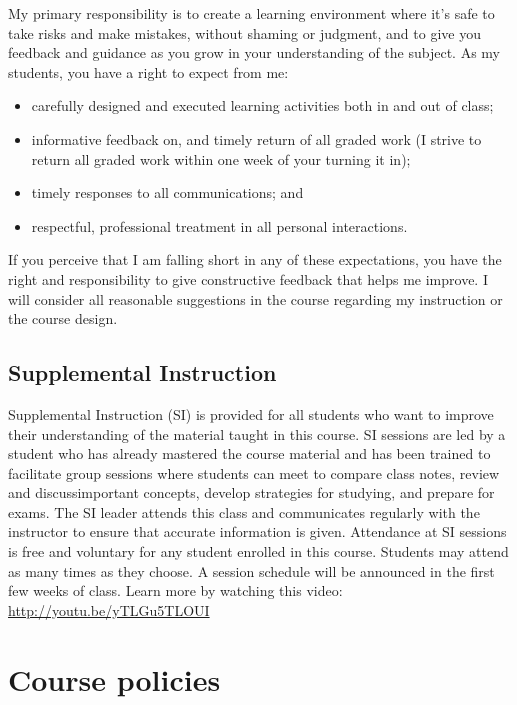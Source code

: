 My primary responsibility is to create a learning environment where it's
safe to take risks and make mistakes, without shaming or judgment, and
to give you feedback and guidance as you grow in your understanding of
the subject. As my students, you have a right to expect from me:

\begin{itemize}
\tightlist
\item
  carefully designed and executed learning activities both in and out of
  class;
\item
  informative feedback on, and timely return of all graded work (I
  strive to return all graded work within one week of your turning it
  in);
\item
  timely responses to all communications; and
\item
  respectful, professional treatment in all personal interactions.
\end{itemize}

If you perceive that I am falling short in any of these expectations,
you have the right and responsibility to give constructive feedback that
helps me improve. I will consider all reasonable suggestions in the
course regarding my instruction or the course design.

\hypertarget{supplemental-instruction-1}{%
\subsection{Supplemental Instruction}\label{supplemental-instruction-1}}

Supplemental Instruction (SI) is provided for all students who want to
improve their understanding of the material taught in this course. SI
sessions are led by a student who has already mastered the course
material and has been trained to facilitate group sessions where
students can meet to compare class notes, review and discussimportant
concepts, develop strategies for studying, and prepare for exams. The SI
leader attends this class and communicates regularly with the instructor
to ensure that accurate information is given. Attendance at SI sessions
is free and voluntary for any student enrolled in this course. Students
may attend as many times as they choose. A session schedule will be
announced in the first few weeks of class. Learn more by watching this
video: \url{http://youtu.be/yTLGu5TLOUI}

\hypertarget{course-policies}{%
\section{Course policies}\label{course-policies}}

